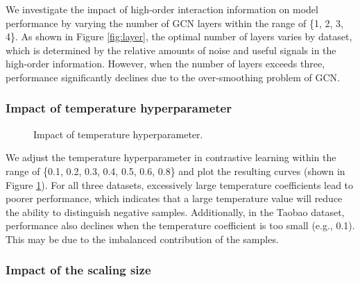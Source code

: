 We investigate the impact of high-order interaction information on model performance by varying the number of GCN layers within the range of \{1, 2, 3, 4\}. As shown in Figure \ref{fig:layer}, the optimal number of layers varies by dataset, which is determined by the relative amounts of noise and useful signals in the high-order information. However, when the number of layers exceeds three, performance significantly declines due to the over-smoothing problem of GCN.

\subsubsection{Impact of temperature hyperparameter}

\begin{figure}[t]
	\setlength{\belowcaptionskip}{0cm}
	\setlength{\abovecaptionskip}{0cm}
	\caption{Impact of temperature hyperparameter.}
        \vspace{-3mm}
	\label{fig:temperature}
\end{figure}

We adjust the temperature hyperparameter in contrastive learning within the range of \{0.1, 0.2, 0.3, 0.4, 0.5, 0.6, 0.8\} and plot the resulting curves (shown in Figure \ref{fig:temperature}). For all three datasets, excessively large temperature coefficients lead to poorer performance, which indicates that a large temperature value will reduce the ability to distinguish negative samples. Additionally, in the Taobao dataset, performance also declines when the temperature coefficient is too small (e.g., 0.1). This may be due to the imbalanced contribution of the samples.

\subsubsection{Impact of the scaling size}


